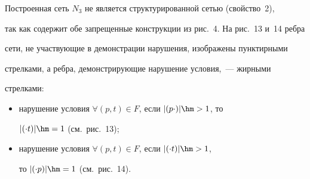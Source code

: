   Построенная сеть $N_3$ не является структурированной сетью (свойство~2), 

так как содержит обе запрещенные конструкции из рис.~4. На рис.~13 и~14 ребра 

сети, не участвующие в демонстрации нарушения, изображены пунктирными 

стрелками, а ребра, демонстрирующие нарушение условия,~--- жирными 

стрелками:

  \begin{itemize}

  \item нарушение условия $\forall (p,t)\in F$,  если $\vert (p\cdot)\vert \hm> 1$,  то 

$\vert (\cdot t)\vert \hm=1$ (см.\ рис.~13);

\item нарушение условия $\forall (p,t)\in F$,  если $\vert (\cdot t)\vert \hm>1$,  

то $\vert (\cdot p)\vert \hm=1$ (см.\ рис.~14).

\end{itemize}



